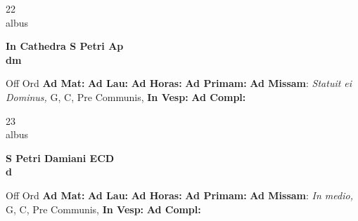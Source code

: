 \documentclass[10pt, openany]{book}
\begin{document}
    \begin{center}
        \begin{minipage}{3.5in}
            \vspace{2em}
            \begin{minipage}{0.5in}
                {\Huge 22} \\
                {\normalsize albus}
            \end{minipage}
            \begin{minipage}{3.0in}
                \textbf{ \large In Cathedra S Petri Ap \\
                \textnormal{\normalsize dm}}

            \end{minipage}
            \begin{justify}Off Ord
                \textbf{Ad Mat: }
                \textbf{Ad Lau: }
                \textbf{Ad Horas: }
                \textbf{Ad Primam: }\textbf{Ad Missam}: \textit{Statuit ei Dominus,} G, C, Pre Communis, 
                \textbf{In Vesp: }
                \textbf{Ad Compl: }
            \end{justify}
        \end{minipage}
    \end{center}

    \begin{center}
        \begin{minipage}{3.5in}
            \vspace{2em}
            \begin{minipage}{0.5in}
                {\Huge 23} \\
                {\normalsize albus}
            \end{minipage}
            \begin{minipage}{3.0in}
                \textbf{ \large S Petri Damiani ECD \\
                \textnormal{\normalsize d}}

            \end{minipage}
            \begin{justify}Off Ord
                \textbf{Ad Mat: }
                \textbf{Ad Lau: }
                \textbf{Ad Horas: }
                \textbf{Ad Primam: }\textbf{Ad Missam}: \textit{In medio,} G, C, Pre Communis, 
                \textbf{In Vesp: }
                \textbf{Ad Compl: }
            \end{justify}
        \end{minipage}
    \end{center}
\end{document}
